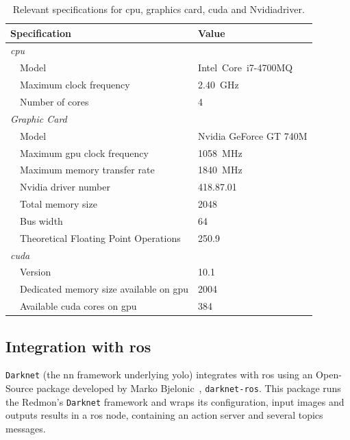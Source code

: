 \begin{table}[H]
	\renewcommand{\arraystretch}{1.2}
	\centering
	\begin{tabular}{@{}lp{7cm}l@{}}
		\toprule
		\multicolumn{2}{l}{Specification} & Value \\ \midrule
		\multicolumn{2}{l}{\emph{\ac{cpu}}} & \\
		\phantom{a} & Model   & Intel\cp~Core\texttrademark~i7-4700MQ \\
								& Maximum clock frequency & \SI{2.40}{\giga\hertz} \\
								& Number of cores & 4 \\ 
		\midrule
		\multicolumn{2}{l}{\emph{Graphic Card}} & \\
		\phantom{a} & Model   & Nvidia GeForce GT 740M \\
								& Maximum \ac{gpu} clock frequency & \SI{1058}{\mega\hertz} \\
								&	Maximum memory transfer rate & \SI{1840}{\mega\hertz} \\
								&	Nvidia driver number & 418.87.01 \\
								& Total memory size & \SI{2048}{\mega\byte} \\
								& Bus width & \SI{64}{\bytes} \\
								& Theoretical Floating Point Operations & \SI{250.9}{\giga\flops} \\
		\midrule 
		\multicolumn{2}{l}{\emph{\ac{cuda}\texttrademark}} \\
								&	Version & 10.1 \\
								&	Dedicated memory size available on \ac{gpu}& \SI{2004}{\mega\byte} \\
								& Available \ac{cuda} cores on \ac{gpu} & 384 \\
		\bottomrule
	\end{tabular}
	\caption{Relevant specifications for \ac{cpu}, graphics card, \ac{cuda} and Nvidia\texttrademark driver.}
	\label{tab:computer-specs}
\end{table}


\subsection{Integration with \ac{ros}}
\texttt{Darknet} (the \ac{nn} framework underlying \ac{yolo}) integrates with \ac{ros} using an Open-Source package developed by Marko Bjelonic~\cite{MarkoBjelonic}, \texttt{darknet-ros}. This package runs the Redmon's \texttt{Darknet} framework and wraps its configuration, input images and outputs results in a \ac{ros} node, containing an action server and several topics messages.

